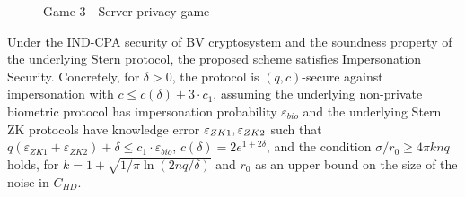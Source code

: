 \begin{figure}[htbp!] 
  \centering
  \caption{Game 3 - Server privacy game}
  \label{fig:game3protocol1server}
\end{figure}

\begin{theorem}
  \label{theo:client}
  Under the IND-CPA security of BV cryptosystem and the soundness property of the underlying Stern protocol, the
  proposed scheme satisfies Impersonation Security. Concretely, for $\delta>0$, the protocol is $(q,c)$-secure against
  impersonation with $c \leq c(\delta) + 3 \cdot c_1$, assuming the underlying non-private biometric protocol has
  impersonation probability $\varepsilon_{bio}$ and the underlying Stern ZK protocols have knowledge error
  $\varepsilon_{ZK1},\varepsilon_{ZK2}$ such that
  $q(\varepsilon_{ZK1}+\varepsilon_{ZK2}) + \delta \leq c_1 \cdot
  \varepsilon_{bio}$, $c(\delta) = 2 e^{1+2\delta}$, and the condition $\sigma/r_0 \geq 4 \pi k n q$ holds, for
  $k = 1 + \sqrt{1/\pi \ln(2nq/\delta)}$ and $r_0$ as an upper bound on the size of the noise in $C_{HD}$.
\end{theorem}

